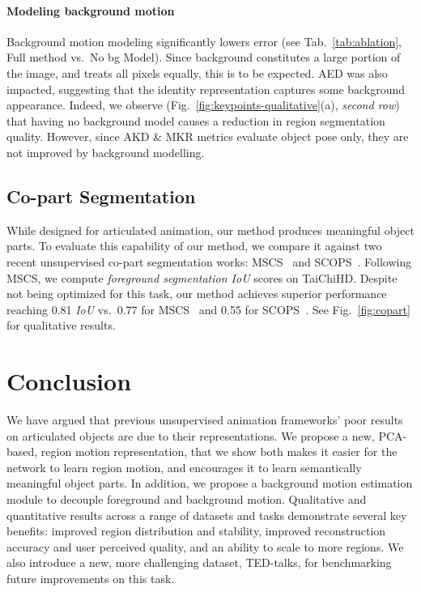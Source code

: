 \documentclass[final]{cvpr}
\begin{document}
\paragraph{Modeling background motion} Background motion modeling significantly lowers  error (see Tab.~\ref{tab:ablation}, Full method vs.\ No bg Model). Since background constitutes a large portion of the image, and  treats all pixels equally, this is to be expected. AED was also impacted, suggesting that the identity representation captures some background appearance. Indeed, we observe (Fig.~\ref{fig:keypoints-qualitative}(a), \emph{second row}) that having no background model causes a reduction in region segmentation quality. However, since AKD \& MKR metrics evaluate object pose only, they are not improved by background modelling.


\subsection{Co-part Segmentation}
\label{sec:co-part}
While designed for articulated animation, our method produces meaningful object parts. To evaluate this capability of our method, we compare it against two recent unsupervised co-part segmentation works: MSCS~\cite{siarohin2020motionsupervised} and SCOPS~\cite{Hung_2019_CVPR}. Following MSCS, we compute \emph{foreground segmentation IoU} scores on TaiChiHD. Despite not being optimized for this task, our method achieves superior performance reaching 0.81 \emph{IoU} vs.\ 0.77 for MSCS~\cite{siarohin2020motionsupervised} and 0.55 for SCOPS~\cite{Hung_2019_CVPR}. See Fig.~\ref{fig:copart} for qualitative results.

\vspace{-0.2cm}
\section{Conclusion}
\vspace{-0.2cm}
We have argued that previous unsupervised animation frameworks' poor results on articulated objects are due to their representations. We propose a new, PCA-based, region motion representation, that we show both makes it easier for the network to learn region motion, and encourages it to learn semantically meaningful object parts. In addition, we propose a background motion estimation module to decouple foreground and background motion. Qualitative and quantitative results across a range of datasets and tasks demonstrate several key benefits: improved region distribution and stability, improved reconstruction accuracy and user perceived quality, and an ability to scale to more regions. We also introduce a new, more challenging dataset, TED-talks, for benchmarking future improvements on this task.
\end{document}
